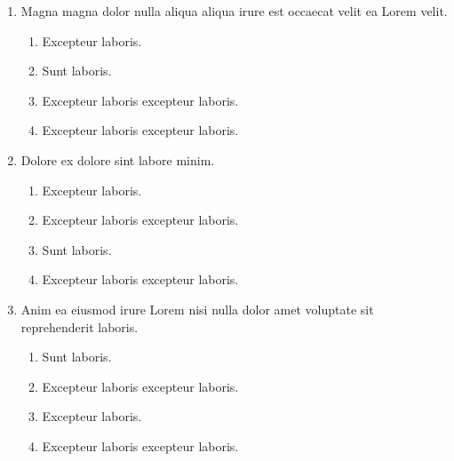 \documentclass[a4paper,12pt]{article}
\begin{document}
\begin{enumerate}[label=\textbf{\arabic*.}]
\begin{multicols}{2}
\end{multicols}
\item Magna magna dolor nulla aliqua aliqua irure est occaecat velit ea Lorem velit.
\begin{multicols}{2}
	\begin{enumerate}
		\item  Excepteur laboris.
    
		\item  Sunt laboris.
    
		\item  Excepteur laboris excepteur laboris.
    
		\item  Excepteur laboris excepteur laboris.
  
	\end{enumerate}

\end{multicols}
\item Dolore ex dolore sint labore minim.
\begin{multicols}{2}
	\begin{enumerate}
		\item  Excepteur laboris.
    
		\item  Excepteur laboris excepteur laboris.
    
		\item  Sunt laboris.
    
		\item  Excepteur laboris excepteur laboris.
  
	\end{enumerate}

\end{multicols}
\item Anim ea eiusmod irure Lorem nisi nulla dolor amet voluptate sit reprehenderit laboris.
\begin{multicols}{2}
	\begin{enumerate}
		\item  Sunt laboris.
    
		\item  Excepteur laboris excepteur laboris.
  
		\item  Excepteur laboris.
    
		\item  Excepteur laboris excepteur laboris.
    
	\end{enumerate}


\end{multicols}
\end{enumerate}
\end{document}
